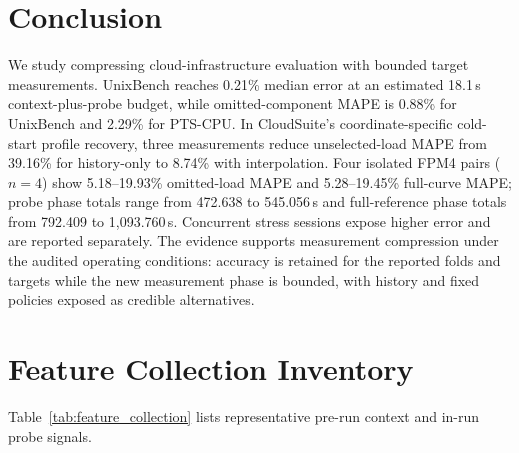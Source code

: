 \documentclass[sigconf, review, anonymous, balance=false]{acmart}
\begin{document}
\section{Conclusion}

We study compressing cloud-infrastructure evaluation with bounded target measurements. UnixBench reaches 0.21\% median error at an estimated 18.1\,s context-plus-probe budget, while omitted-component MAPE is 0.88\% for UnixBench and 2.29\% for PTS-CPU. In CloudSuite's coordinate-specific cold-start profile recovery, three measurements reduce unselected-load MAPE from 39.16\% for history-only to 8.74\% with interpolation. Four isolated FPM4 pairs ($n=4$) show 5.18--19.93\% omitted-load MAPE and 5.28--19.45\% full-curve MAPE; probe phase totals range from 472.638 to 545.056\,s and full-reference phase totals from 792.409 to 1,093.760\,s. Concurrent stress sessions expose higher error and are reported separately. The evidence supports measurement compression under the audited operating conditions: accuracy is retained for the reported folds and targets while the new measurement phase is bounded, with history and fixed policies exposed as credible alternatives.


\clearpage


\clearpage
\appendix
\section{Feature Collection Inventory}
\label{app:feature-collection}

Table~\ref{tab:feature_collection} lists representative pre-run context and in-run probe signals.
\end{document}
